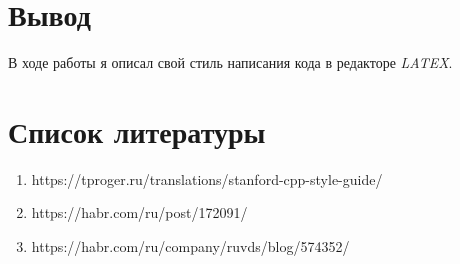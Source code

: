\documentclass[12pt]{article}
\begin{document}
\section{Вывод}
В ходе работы я описал свой стиль написания кода в редакторе \textit{LATEX}.

\section{Список литературы}

\begin{enumerate}
    \item https://tproger.ru/translations/stanford-cpp-style-guide/
    \item https://habr.com/ru/post/172091/
    \item https://habr.com/ru/company/ruvds/blog/574352/
\end{enumerate}
\end{document}
